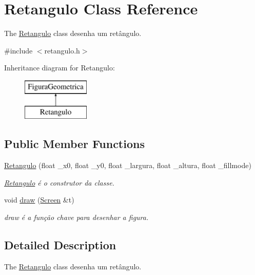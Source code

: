 \hypertarget{class_retangulo}{}\section{Retangulo Class Reference}
\label{class_retangulo}


The \mbox{\hyperlink{class_retangulo}{Retangulo}} class desenha um retângulo.  




{\ttfamily \#include $<$retangulo.\+h$>$}

Inheritance diagram for Retangulo\+:\begin{figure}[H]
\begin{center}
\leavevmode
\includegraphics[height=2.000000cm]{class_retangulo}
\end{center}
\end{figure}
\subsection*{Public Member Functions}
\begin{DoxyCompactItemize}
\item 
\mbox{\hyperlink{class_retangulo_a733b3023ddff14f26b00d401b46411fd}{Retangulo}} (float \+\_\+x0, float \+\_\+y0, float \+\_\+largura, float \+\_\+altura, float \+\_\+fillmode)
\begin{DoxyCompactList}\small\item\em \mbox{\hyperlink{class_retangulo}{Retangulo}} é o construtor da classe. \end{DoxyCompactList}\item 
void \mbox{\hyperlink{class_retangulo_ac088dd6d3f4f3d3f80363a868c2e74f1}{draw}} (\mbox{\hyperlink{class_screen}{Screen}} \&t)
\begin{DoxyCompactList}\small\item\em draw é a função chave para desenhar a figura. \end{DoxyCompactList}\end{DoxyCompactItemize}


\subsection{Detailed Description}
The \mbox{\hyperlink{class_retangulo}{Retangulo}} class desenha um retângulo. 

